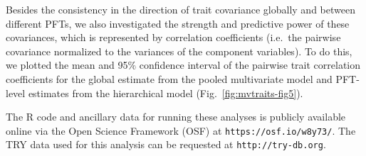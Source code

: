 Besides the consistency in the direction of trait covariance globally and between different PFTs, we also investigated the strength and predictive power of these covariances, which is represented by correlation coefficients (i.e.\ the pairwise covariance normalized to the variances of the component variables).
To do this, we plotted the mean and 95\% confidence interval of the pairwise trait correlation coefficients for the global estimate from the pooled multivariate model and PFT-level estimates from the hierarchical model (Fig.~\ref{fig:mvtraits-fig5}).

The R code and ancillary data for running these analyses is publicly available online via the Open Science Framework (OSF) at \texttt{https://osf.io/w8y73/}.
The TRY data used for this analysis can be requested at \texttt{http://try-db.org}.
